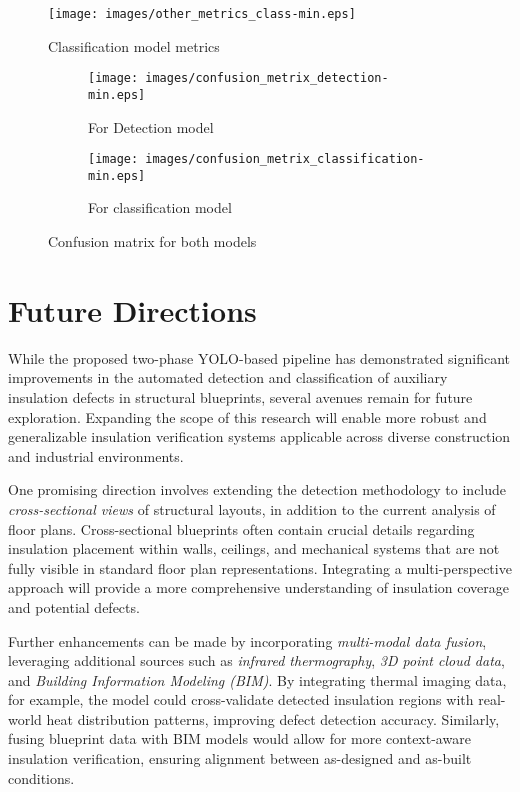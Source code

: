 \documentclass[]{IEEEphot}
\begin{document}
\begin{figure}[h]
    \centering
    \texttt{[image: images/other\_metrics\_class-min.eps]}
    \caption{Classification model metrics}
    \label{fig:enter-label}
\end{figure}
\begin{figure}[H]
\centering
\begin{subfigure}[b]{0.45\textwidth}
\centering
\texttt{[image: images/confusion\_metrix\_detection-min.eps]} %
\caption{For Detection model}
\label{fig:sub1}
\end{subfigure}
\hfill
\begin{subfigure}[b]{0.45\textwidth}
\centering
\texttt{[image: images/confusion\_metrix\_classification-min.eps]} %
\caption{For classification model }
\label{fig:sub2}
\end{subfigure}

\caption{Confusion matrix for both models}
\label{fig:two_images}
\end{figure}
\section{Future Directions}
\label{sec:future_directions}

While the proposed two-phase YOLO-based pipeline has demonstrated significant improvements in the automated detection and classification of auxiliary insulation defects in structural blueprints, several avenues remain for future exploration. Expanding the scope of this research will enable more robust and generalizable insulation verification systems applicable across diverse construction and industrial environments.

One promising direction involves extending the detection methodology to include \textit{cross-sectional views} of structural layouts, in addition to the current analysis of floor plans. Cross-sectional blueprints often contain crucial details regarding insulation placement within walls, ceilings, and mechanical systems that are not fully visible in standard floor plan representations. Integrating a multi-perspective approach will provide a more comprehensive understanding of insulation coverage and potential defects.

Further enhancements can be made by incorporating \textit{multi-modal data fusion}, leveraging additional sources such as \textit{infrared thermography}, \textit{3D point cloud data}, and \textit{Building Information Modeling (BIM)}. By integrating thermal imaging data, for example, the model could cross-validate detected insulation regions with real-world heat distribution patterns, improving defect detection accuracy. Similarly, fusing blueprint data with BIM models would allow for more context-aware insulation verification, ensuring alignment between as-designed and as-built conditions.
\end{document}
